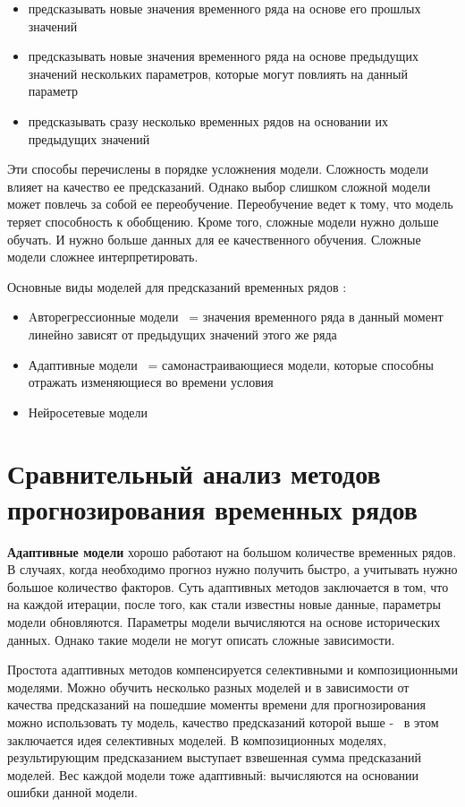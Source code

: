 \begin{itemize}
	\item предсказывать новые значения временного ряда на основе его прошлых значений
	\item предсказывать новые значения временного ряда на основе предыдущих значений
	нескольких параметров, которые могут повлиять на данный параметр
	\item предсказывать сразу несколько временных рядов на основании их предыдущих значений
\end{itemize}

Эти способы перечислены в порядке усложнения модели. Сложность модели влияет на
качество ее предсказаний. Однако выбор слишком сложной модели может повлечь
за собой ее переобучение. Переобучение ведет к тому, что модель теряет способность
к обобщению. Кроме того, сложные модели нужно дольше обучать. И нужно больше данных
для ее качественного обучения. Сложные модели сложнее интерпретировать.

Основные виды моделей для предсказаний временных рядов \cite{voron}:
\begin{itemize}
	\item Aвторегрессионные модели ~= значения временного ряда в данный момент
	линейно зависят от предыдущих значений этого же ряда
	\item Адаптивные модели ~= самонастраивающиеся модели,
	которые способны отражать изменяющиеся во времени условия
	\item Нейросетевые модели
\end{itemize}


\section{Сравнительный анализ методов прогнозирования временных рядов}

\textbf{Адаптивные модели} хорошо работают на большом количестве временных рядов.
В случаях, когда необходимо прогноз нужно получить быстро, а учитывать
нужно большое количество факторов. Суть адаптивных
методов заключается в том, что на каждой итерации, после того, как стали
известны новые данные, параметры модели обновляются. Параметры модели вычисляются
на основе исторических данных. Однако такие модели не могут описать сложные
зависимости.

Простота адаптивных методов компенсируется селективными и композиционными моделями.
Можно обучить несколько разных моделей и в зависимости от качества предсказаний на пошедшие
моменты времени для прогнозирования можно использовать ту модель, качество предсказаний
которой выше -~ в этом заключается идея селективных моделей. В композиционных моделях,
результирующим предсказанием выступает взвешенная сумма предсказаний моделей. Вес каждой модели
тоже адаптивный: вычисляются на основании ошибки данной модели.

